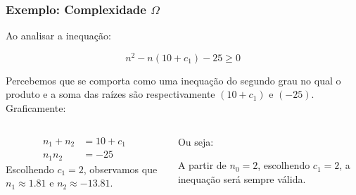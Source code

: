 \documentclass[10pt]{beamer}
\begin{document}
\begin{frame}[t]
    \frametitle{Exemplo: Complexidade $\Omega$}

    Ao analisar a inequação:

    $$n^2 - n(10+c_1) - 25    \geq 0$$

    Percebemos que se comporta como uma inequação do segundo grau no qual o produto e a soma das raízes são respectivamente $(10+c_1)$ e $(-25)$. Graficamente:

    \begin{center}

    \end{center}
    \begin{flushleft}
        \begin{columns}
            \begin{column}{0.45\textwidth}
                \begin{align*}
                    n_1 + n_2 & = 10+c_1 \\
                    n_1n_2    & = -25
                \end{align*}
                Escolhendo $c_1=2$, observamos que $n_1 \approx 1.81$ e $n_2 \approx -13.81$.
            \end{column}
            \begin{column}{0.45\textwidth}
                Ou seja:

                A partir de $n_0=2$, escolhendo $c_1=2$, a inequação será sempre válida.
            \end{column}
        \end{columns}
    \end{flushleft}
\end{frame}
\end{document}

